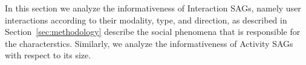 %   
                

In this section we analyze the informativeness of Interaction SAGs,
namely user interactions according to their modality, type, and direction, 
as described in Section~\ref{sec:methodology} describe the social phenomena
that is responsible for the characterstics. Similarly, we analyze the 
informativeness of Activity SAGs with respect to its size.

